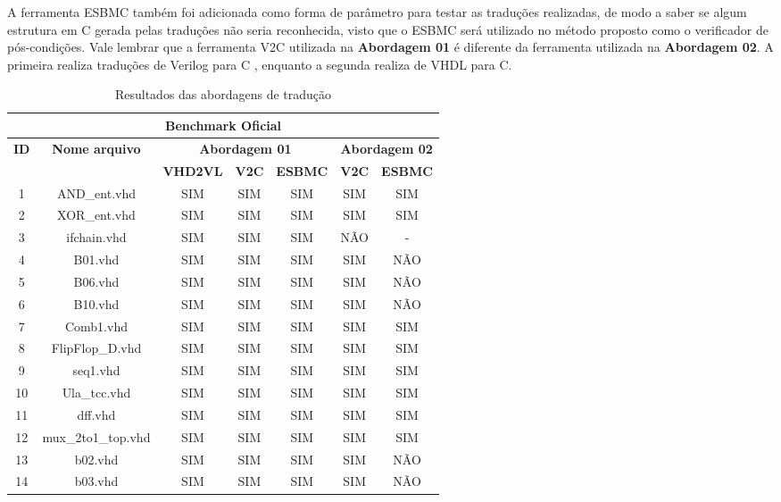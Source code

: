 \par
A ferramenta ESBMC também foi adicionada como forma de parâmetro para testar as traduções realizadas, de modo a saber se algum estrutura em C gerada pelas traduções não seria reconhecida, visto que o ESBMC será utilizado no método proposto como o verificador de pós-condições. Vale lembrar que a ferramenta V2C utilizada na \textbf{Abordagem 01} é diferente da ferramenta utilizada na \textbf{Abordagem 02}. A primeira realiza traduções de Verilog para C
, enquanto a segunda realiza de VHDL para C. 

\begin{table}[H]
\centering
\caption{Resultados das abordagens de tradução}
\label{tab:tabela_resultado}
\begin{tabular}{|c|c|c|c|c|c|c|}
\hline
\multicolumn{7}{|c|}{\textbf{Benchmark Oficial}} \\ \hline
\multirow{2}{*}{\textbf{ID}} & \multirow{2}{*}{\textbf{Nome arquivo}} & \multicolumn{3}{c|}{\textbf{Abordagem 01}} & \multicolumn{2}{c|}{\textbf{Abordagem 02}} \\ \cline{3-7} 
 &  & \textbf{VHD2VL} & \textbf{V2C} & \multicolumn{1}{l|}{\textbf{ESBMC}} & \textbf{V2C} & \multicolumn{1}{l|}{\textbf{ESBMC}} \\ \hline
1 & AND\_ent.vhd & SIM & SIM & SIM & SIM & SIM \\ \hline
2 & XOR\_ent.vhd & SIM & SIM & SIM & SIM & SIM \\ \hline
3 & ifchain.vhd & SIM & SIM & SIM & NÃO & - \\ \hline
4 & B01.vhd & SIM & SIM & SIM & SIM & NÃO \\ \hline
5 & B06.vhd & SIM & SIM & SIM & SIM & NÃO \\ \hline
6 & B10.vhd & SIM & SIM & SIM & SIM & NÃO \\ \hline
7 & Comb1.vhd & SIM & SIM & SIM & SIM & SIM \\ \hline
8 & FlipFlop\_D.vhd & SIM & SIM & SIM & SIM & SIM \\ \hline
9 & seq1.vhd & SIM & SIM & SIM & SIM & SIM \\ \hline
10 & Ula\_tcc.vhd & SIM & SIM & SIM & SIM & SIM \\ \hline
11 & dff.vhd & SIM & SIM & SIM & SIM & SIM \\ \hline
12 & mux\_2to1\_top.vhd & SIM & SIM & SIM & SIM & SIM \\ \hline
13 & b02.vhd & SIM & SIM & SIM & SIM & NÃO \\ \hline
14 & b03.vhd & SIM & SIM & SIM & SIM & NÃO \\ \hline

\end{tabular}
\end{table}
